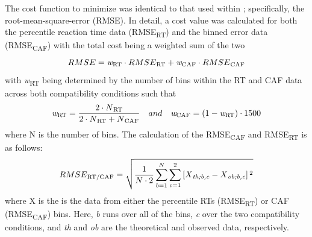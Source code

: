 The cost function to minimize was identical to that used within
\textcite{ulrich2015automatic}; specifically, the root-mean-square-error
(RMSE). In detail, a cost value was calculated for both the percentile reaction time data
(RMSE\textsubscript{RT}) and the binned error data (RMSE\textsubscript{CAF}) with the
total cost being a weighted sum of the two
\begin{equation*}
    RMSE = \textit{w}\textsubscript{RT} \cdot RMSE\textsubscript{RT} + \textit{w}\textsubscript{CAF} \cdot RMSE\textsubscript{CAF}  
\end{equation*}
with \textit{w}\textsubscript{RT} being determined by the number of bins 
within the RT and CAF data across both compatibility conditions such that 
\begin{equation*}
    \textit{w}\textsubscript{RT} = \frac{2 \cdot N\textsubscript{RT}} {2 \cdot N\textsubscript{RT} + N\textsubscript{CAF}} \quad and \quad  \textit{w}\textsubscript{CAF} = (1 - \textit{w}\textsubscript{RT}) \cdot 1500
\end{equation*}
where N is the number of bins. The calculation of the RMSE\textsubscript{CAF} and
RMSE\textsubscript{RT} is as follows:
\begin{equation*}
    RMSE\textsubscript{RT/CAF} = \sqrt{\frac{1}{N\cdot2} \sum_{b=1}^{N} \sum_{c=1}^{2} \left[X\textsubscript{\textit{th;b,c}} - X\textsubscript{\textit{ob;b,c}} \right] \textsuperscript{2}} 
\end{equation*}
where X is the is the data from either the percentile RTs
(RMSE\textsubscript{RT}) or CAF (RMSE\textsubscript{CAF}) bins. Here,
\textit{b} runs over all of the bins, \textit{c} over the two compatibility
conditions, and \textit{th} and \textit{ob} are the theoretical and observed
data, respectively. 

